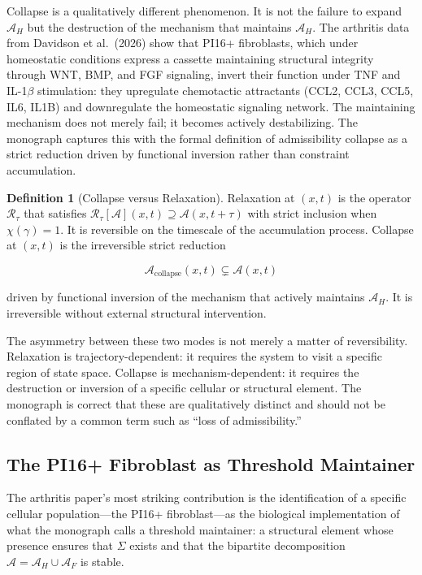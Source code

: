 \documentclass[12pt, a4paper]{article}
\theoremstyle{definition}
\newtheorem{defn}{Definition}[section]
\begin{document}
Collapse is a qualitatively different phenomenon. It is not the failure to expand $\mathcal{A}_H$ but the destruction of the mechanism that maintains $\mathcal{A}_H$. The arthritis data from Davidson et al.\ (2026) show that PI16+ fibroblasts, which under homeostatic conditions express a cassette maintaining structural integrity through WNT, BMP, and FGF signaling, invert their function under TNF and IL-1$\beta$ stimulation: they upregulate chemotactic attractants (CCL2, CCL3, CCL5, IL6, IL1B) and downregulate the homeostatic signaling network. The maintaining mechanism does not merely fail; it becomes actively destabilizing. The monograph captures this with the formal definition of admissibility collapse as a strict reduction driven by functional inversion rather than constraint accumulation.

\begin{defn}[Collapse versus Relaxation]
Relaxation at $(x,t)$ is the operator $\mathcal{R}_\tau$ that satisfies $\mathcal{R}_\tau[\mathcal{A}](x,t) \supseteq \mathcal{A}(x,t+\tau)$ with strict inclusion when $\chi(\gamma) = 1$. It is reversible on the timescale of the accumulation process. Collapse at $(x,t)$ is the irreversible strict reduction

\begin{equation}
\mathcal{A}_{\mathrm{collapse}}(x,t) \subsetneq \mathcal{A}(x,t)
\end{equation}

driven by functional inversion of the mechanism that actively maintains $\mathcal{A}_H$. It is irreversible without external structural intervention.
\end{defn}

The asymmetry between these two modes is not merely a matter of reversibility. Relaxation is trajectory-dependent: it requires the system to visit a specific region of state space. Collapse is mechanism-dependent: it requires the destruction or inversion of a specific cellular or structural element. The monograph is correct that these are qualitatively distinct and should not be conflated by a common term such as ``loss of admissibility.''

\subsection{The PI16+ Fibroblast as Threshold Maintainer}

The arthritis paper's most striking contribution is the identification of a specific cellular population---the PI16+ fibroblast---as the biological implementation of what the monograph calls a threshold maintainer: a structural element whose presence ensures that $\Sigma$ exists and that the bipartite decomposition $\mathcal{A} = \mathcal{A}_H \cup \mathcal{A}_F$ is stable.
\end{document}

